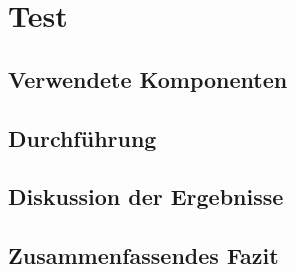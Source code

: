 \chapter{Test}
\thispagestyle{standard}
\pagestyle{standard}

\section{Verwendete Komponenten}

\section{Durchführung}


\section{Diskussion der Ergebnisse}


\section{Zusammenfassendes Fazit}